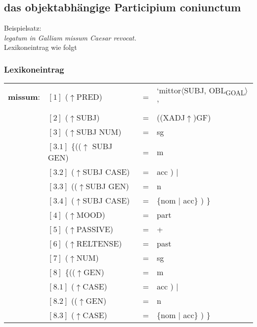 \documentclass[12pt,a4paper]{article}
\begin{document}
\subsection{das objektabhängige Participium coniunctum}
Beispielsatz:\\
\textit{legatum in Galliam missum Caesar revocat.} \\
Lexikoneintrag wie folgt

\subsubsection{Lexikoneintrag}
\begin{singlespace}
\begin{tabular}{ l  l  l  l  } 
\textbf{missum}: & $[1]$ \:  ($\uparrow$PRED) & = & `mittor$\langle$SUBJ, OBL\textsubscript{GOAL}$\rangle$'\\
$\qquad$ & $[2]$ \:  ($\uparrow$SUBJ) & = & ((XADJ$\uparrow$)GF)\\
$\qquad$ & $[3]$ \:  ($\uparrow$SUBJ NUM) & = & sg \\
$\qquad$ & $[3.1]$ \:  \{(($\uparrow$ SUBJ GEN) & = & m \\ 
$\qquad$ & $[3.2]$ \:  ($\uparrow$SUBJ CASE) & = & acc ) $\mid$\\
$\qquad$ & $[3.3]$ \: (($\uparrow$SUBJ GEN) & = & n \\
$\qquad$ & $[3.4]$ \:  ($\uparrow$SUBJ CASE) & = & \{nom $\mid$ acc\} ) \}\\
$\qquad$ & $[4]$ \:  ($\uparrow$MOOD) & = & part\\
$\qquad$ & $[5]$ \:  ($\uparrow$PASSIVE) & = & + \\
$\qquad$ & $[6]$ \:  ($\uparrow$RELTENSE) & = & past \\
$\qquad$ & $[7]$ \:  ($\uparrow$NUM) & = & sg \\
$\qquad$ & $[8]$ \:  \{(($\uparrow$GEN) & = & m \\ 
$\qquad$ & $[8.1]$ \:  ($\uparrow$CASE) & = & acc ) $\mid$\\
$\qquad$ & $[8.2]$ \: (($\uparrow$GEN) & = & n \\
$\qquad$ & $[8.3]$ \:  ($\uparrow$CASE) & = & \{nom $\mid$ acc\} ) \}\\
\end{tabular}
\newline
\newline
\end{singlespace}

\end{document}
